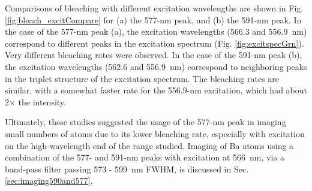 Comparisons of bleaching with different excitation wavelengths are shown in Fig. \ref{fig:bleach_excitCompare} for (a) the 577-nm peak, and (b) the 591-nm peak.  In the case of the 577-nm peak (a), the excitation wavelengths (566.3 and 556.9~nm) correspond to different peaks in the excitation spectrum (Fig. \ref{fig:excitspecGrn}).  Very different bleaching rates were observed.  In the case of the 591-nm peak (b), the excitation wavelengths (562.6 and 556.9~nm) correspond to neighboring peaks in the triplet structure of the excitation spectrum.  The bleaching rates are similar, with a somewhat faster rate for the 556.9-nm excitation, which had about 2$\times$ the intensity.


Ultimately, these studies suggested the usage of the 577-nm peak in imaging small numbers of atoms due to its lower bleaching rate, especially with excitation on the high-wavelength end of the range studied.  Imaging of Ba atoms using a combination of the 577- and 591-nm peaks with excitation at 566~nm, via a band-pass filter passing 573 - 599~nm FWHM, is discussed in Sec. \ref{sec:imaging590and577}.

